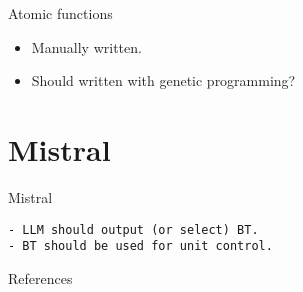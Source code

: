 \documentclass[aspectratio=32]{beamer}
\providecommand{\tightlist}{\setlength{\itemsep}{0pt}\setlength{\parskip}{0pt}}
\begin{document}
  \begin{frame}[allowframebreaks]{\textbar{} Atomic functions}
  \begin{itemize}
  \tightlist
  \item
    Manually written.
  \item
    Should written with genetic programming?
  \end{itemize}
  \end{frame}

  \section{\textbar{} Mistral}\label{mistral}

  \begin{frame}[fragile]{\textbar{} Mistral}
\begin{lstlisting}
- LLM should output (or select) BT.
- BT should be used for unit control.
\end{lstlisting}
  \end{frame}


\begin{frame}
  \Large{References}
  \small\linespread{1.2}\printbibliography
\end{frame}
\end{document}
